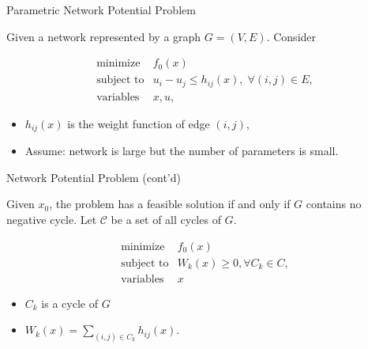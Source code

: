\documentclass[10pt,ignorenonframetext,serif,onlymath]{beamer}
\begin{document}
\begin{frame}{Parametric Network Potential Problem}
\protect\hypertarget{sec:parametric-network-potential-problem-1}{}

Given a network represented by a graph \(G = (V, E)\). Consider

\[\begin{array}{ll}
    \text{minimize} & f_0(x) \\
    \text{subject to} & u_i - u_j \le h_{ij}(x), \; \forall (i, j) \in E ,\\
    \text{variables} &x, u ,
   \end{array}\]

\begin{itemize}
\item
  \(h_{ij}(x)\) is the weight function of edge \((i,j)\),
\item
  Assume: network is large but the number of parameters is small.
\end{itemize}

\end{frame}

\begin{frame}{Network Potential Problem (cont’d)}
\protect\hypertarget{sec:network-potential-problem-contd}{}

Given \(x_0\), the problem has a feasible solution if and only if \(G\)
contains no negative cycle. Let \(\mathcal{C}\) be a set of all cycles
of \(G\).

\[\begin{array}{ll}
    \text{minimize} & f_0(x) \\
    \text{subject to} & W_k(x) \ge 0, \forall C_k \in C ,\\
       \text{variables} & x
   \end{array}\]

\begin{itemize}
\item
  \(C_k\) is a cycle of \(G\)
\item
  \(W_k(x) = \sum_{ (i,j)\in C_k} h_{ij}(x)\).
\end{itemize}

\end{frame}
\end{document}
